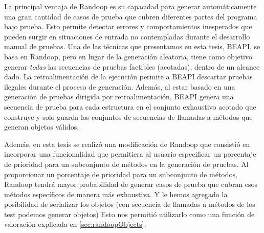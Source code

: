 La principal ventaja de \textsf{Randoop} es su capacidad para generar automáticamente una gran cantidad de casos de prueba que cubren diferentes partes del programa bajo prueba. Esto permite detectar errores y comportamientos inesperados que pueden surgir en situaciones de entrada no contempladas durante el desarrollo manual de pruebas.
Una de las técnicas que presentamos en esta tesis, \textsf{BEAPI}, se basa en \textsf{Randoop}, pero en lugar de la generación aleatoria, tiene como objetivo generar \emph{todas} las secuencias de pruebas factibles (acotadas), dentro de un alcance dado. La retroalimentación de la ejecución permite a \textsf{BEAPI} descartar pruebas ilegales durante el proceso de generación. Además, al estar basado en una generación de pruebas dirigida por retroalimentación, \textsf{BEAPI} genera una secuencia de prueba para cada estructura en el conjunto exhaustivo acotado que construye y solo guarda los conjuntos de secuencias de llamadas a métodos que generan objetos válidos.


Además, en esta tesis se realizó una modificación de Randoop que consistió en incorporar una funcionalidad que permitiera al usuario especificar un porcentaje de prioridad para un subconjunto de métodos en la generación de pruebas. Al proporcionar un porcentaje de prioridad para un subconjunto de métodos, Randoop tendrá mayor probabilidad de generar casos de prueba que cubran esos métodos específicos de manera más exhaustiva. Y le hemos agregado la posibilidad de serializar los objetos (con secuencia de llamadas a métodos de los test podemos generar objetos) Esto nos permitió utilizarlo como una función de valoración explicada en \ref{sec:randoopObjects}.





